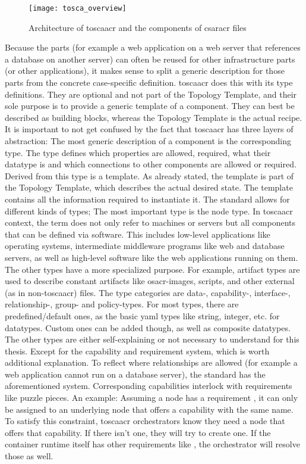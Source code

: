 \begin{figure}[H]
  \texttt{[image: tosca\_overview]}
  \centering
  \caption{Architecture of \gls{toscaacr} and the components of \gls{csaracr} files \cite{tosca_standard_v2}} %
  \label{image:tosca_overview}
\end{figure}

Because the parts (for example a web application on a web server that references a database on another server) can often be reused for other infrastructure parts (or other applications), it makes sense to split a generic description for those parts from the concrete case-specific definition. \Gls{toscaacr} does this with its type definitions. They are optional and not part of the Topology Template, and their sole purpose is to provide a generic template of a component. They can best be described as building blocks, whereas the Topology Template is the actual recipe. It is important to not get confused by the fact that \gls{toscaacr} has three layers of abstraction: The most generic description of a component is the corresponding type. The type defines which properties are allowed, required, what their datatype is and which connections to other components are allowed or required. Derived from this type is a template. As already stated, the template is part of the Topology Template, which describes the actual desired state. The template contains all the information required to instantiate it. 
\newline
The standard allows for different kinds of types; The most important type is the node type. In \gls{toscaacr} context, the term  does not only refer to machines or servers but all components that can be defined via software. This includes low-level applications like operating systems, intermediate middleware programs like web and database servers, as well as high-level software like the web applications running on them. The other types have a more specialized purpose. For example, artifact types are used to describe constant artifacts like \gls{osacr}-images, scripts, and other external (as in non-\gls{toscaacr}) files. The type categories are data-, capability-, interface-, relationship-, group- and policy-types. For most types, there are predefined/default ones, as the basic \gls{yaml} types like string, integer, etc. for datatypes. Custom ones can be added though, as well as composite datatypes. The other types are either self-explaining or not necessary to understand for this thesis. Except for the capability and requirement system, which is worth additional explanation. To reflect where relationships are allowed (for example a web application cannot run on a database server), the standard has the aforementioned system. Corresponding capabilities interlock with requirements like puzzle pieces. An example: Assuming a node has a requirement , it can only be assigned to an underlying node that offers a capability with the same name. To satisfy this constraint, \gls{toscaacr} orchestrators know they need a node that offers that capability. If there isn't one, they will try to create one. If the container runtime itself has other requirements like , the orchestrator will resolve those as well.
